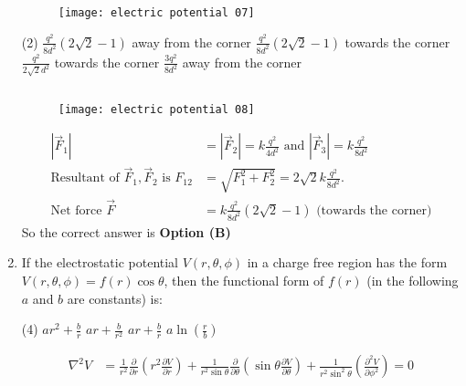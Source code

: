 \begin{enumerate}
	{}
	\begin{figure}[H]
		\centering
		\texttt{[image: electric potential 07]}
	\end{figure}
	\begin{tasks}(2)
		\task[\textbf{A.}] $\frac{q^{2}}{8 d^{2}}(2 \sqrt{2}-1)$ away from the corner
		\task[\textbf{B.}] $\frac{q^{2}}{8 d^{2}}(2 \sqrt{2}-1)$ towards the corner
		\task[\textbf{C.}] $\frac{q^{2}}{2 \sqrt{2} d^{2}}$ towards the corner
		\task[\textbf{D.}] $\frac{3 q^{2}}{8 d^{2}}$ away from the corner
	\end{tasks}
	\begin{answer}$\left. \right. $
		\begin{figure}[H]
			\centering
			\texttt{[image: electric potential 08]}
		\end{figure}
		\begin{align*}
		\left|\vec{F}_{1}\right|&=\left|\vec{F}_{2}\right|=k \frac{q^{2}}{4 d^{2}} \text{ and } \left|\vec{F}_{3}\right|=k \frac{q^{2}}{8 d^{2}}\\
		\text{Resultant of }\vec{F}_{1}, \vec{F}_{2}\text{ is }F_{12}&=\sqrt{F_{1}^{2}+F_{2}^{2}}=2 \sqrt{2} k \frac{q^{2}}{8 d^{2}}.\\
		\text{Net force }\vec{F}&=k \frac{q^{2}}{8 d^{2}}(2 \sqrt{2}-1)\text{ (towards the corner)}
		\end{align*}
		So the correct answer is \textbf{Option (B)}
	\end{answer}
	\item If the electrostatic potential $V(r, \theta, \phi)$ in a charge free region has the form $V(r, \theta, \phi)=f(r) \cos \theta$, then the functional form of $f(r)$ (in the following $a$ and $b$ are constants) is:
	{}
	\begin{tasks}(4)
		\task[\textbf{A.}] $a r^{2}+\frac{b}{r}$
		\task[\textbf{B.}] $a r+\frac{b}{r^{2}}$
		\task[\textbf{C.}] $a r+\frac{b}{r}$
		\task[\textbf{D.}] $a \ln \left(\frac{r}{b}\right)$
	\end{tasks}
	\begin{answer}
		\begin{align*}
		\nabla^{2} V&=\frac{1}{r^{2}} \frac{\partial}{\partial r}\left(r^{2} \frac{\partial V}{\partial r}\right)+\frac{1}{r^{2} \sin \theta} \frac{\partial}{\partial \theta}\left(\sin \theta \frac{\partial V}{\partial \theta}\right)+\frac{1}{r^{2} \sin ^{2} \theta}\left(\frac{\partial^{2} V}{\partial \phi^{2}}\right)=0\\

\end{align*}
\end{answer}
\end{enumerate}
